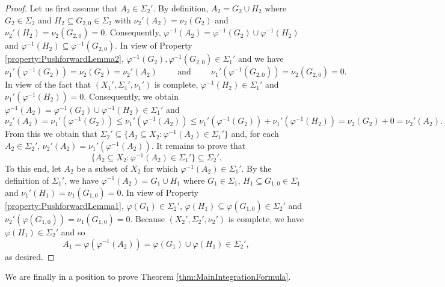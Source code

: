 \documentclass[11pt]{article}
\begin{document}
\begin{proof}
Let us first assume that $A_2\in\Sigma_2'$. By definition, $A_2=G_2\cup H_2$ where $G_2\in\Sigma_2$ and $H_2\subseteq G_{2,0}\in \Sigma_2$ with $\nu_2'(A_2)=\nu_2(G_2)$ and $\nu_2'(H_2)=\nu_2(G_{2,0})=0$. Consequently, $\varphi^{-1}(A_2)=\varphi^{-1}(G_2)\cup\varphi^{-1}(H_2)$ and $\varphi^{-1}(H_2)\subseteq \varphi^{-1}(G_{2,0})$. In view of Property \ref{property:PushforwardLemma2}, $\varphi^{-1}(G_2),\varphi^{-1}(G_{2,0})\in \Sigma_1'$ and we have
\begin{equation*}
\nu_1'(\varphi^{-1}(G_2))=\nu_2(G_2)=\nu_2'(A_2)\hspace{1cm}\mbox{and}\hspace{1cm}\nu_1'(\varphi^{-1}(G_{2,0}))=\nu_2(G_{2,0})=0.
\end{equation*}
In view of the fact that $(X_1',\Sigma_1',\nu_1')$ is complete, $\varphi^{-1}(H_2)\in\Sigma_1'$ and $\nu_1'(\varphi^{-1}(H_2))=0$. Consequently, we obtain $\varphi^{-1}(A_2)=\varphi^{-1}(G_2)\cup\varphi^{-1}(H_2)\in\Sigma_1'$ and
\begin{equation*}
\nu_2'(A_2)=\nu_1'(\varphi^{-1}(G_2))\leq\nu_1'(\varphi^{-1}(A_2))\leq\nu_1'(\varphi^{-1}(G_2))+\nu_1'(\varphi^{-1}(H_2))=\nu_2(G_2)+0=\nu_2'(A_2).
\end{equation*}
From this we obtain that $\Sigma_2'\subseteq \{A_2\subseteq X_2:\varphi^{-1}(A_2)\in\Sigma_1'\}$ and, for each $A_2\in\Sigma_2'$, $\nu_2'(A_2)=\nu_1'(\varphi^{-1}(A_2))$. It remains to prove that
\begin{equation*}
\{A_2\subseteq X_2:\varphi^{-1}(A_2)\in\Sigma_1'\}\subseteq \Sigma_2'.
\end{equation*}
To this end, let $A_2$ be a subset of $X_2$ for which $\varphi^{-1}(A_2)\in\Sigma_1'$. By the definition of $\Sigma_1'$, we have $\varphi^{-1}(A_2)=G_1\cup H_1$ where $G_1\in\Sigma_1$, $H_1\subseteq G_{1,0}\in\Sigma_1$ and $\nu_1'(H_1)=\nu_1(G_{1,0})=0$. In view of Property \ref{property:PushforwardLemma1}, $\varphi(G_1)\in\Sigma_2'$, $\varphi(H_1)\subseteq\varphi(G_{1,0})\in\Sigma_2'$ and $\nu_2'(\varphi(G_{1,0}))=\nu_1(G_{1,0})=0$. Because $(X_2',\Sigma_2',\nu_2')$ is complete, we have $\varphi(H_1)\in\Sigma_2'$ and so
\begin{equation*}
A_1=\varphi(\varphi^{-1}(A_2))=\varphi(G_1)\cup\varphi(H_1)\in \Sigma_2',
\end{equation*}
as desired.
\end{proof}

\noindent We are finally in a position to prove Theorem \ref{thm:MainIntegrationFormula}.
\end{document}
